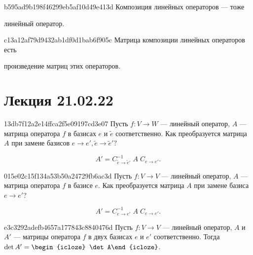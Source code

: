 \begin{note}{b595ad9b198f46299eb5af10d49e413d}
    Композиция линейных операторов --- тоже \begin{icloze}{1}линейный оператор.\end{icloze}
\end{note}

\begin{note}{c13a12af79d9432ab1df0d1bab6f905c}
    Матрица композиции линейных операторов есть \begin{icloze}{1}произведение матриц этих операторов.\end{icloze}
\end{note}

\section{Лекция 21.02.22}
\begin{note}{13db7f12a2e14ffca2f5e09197cd3e07}
    Пусть \( f : V \to W \) --- линейный оператор,  \( A \) --- матрица оператора \( f \) в базисах \( e \) и \( \tilde e \) соответственно. Как преобразуется матрица \( A \) при замене базисов \( e \to e', \tilde e \to \tilde e'? \)

    \begin{cloze}{1}
        \[
            A' = C^{-1}_{\tilde e \to \tilde e'} \; A \; C_{e \to e'}.
        \]
    \end{cloze}
\end{note}

\begin{note}{015e02c15f134a53b50a24729fb6ac3d}
    Пусть \( f : V \to V \) --- линейный оператор,  \( A \) --- матрица оператора \( f \) в базисе \( e \). Как преобразуется матрица \( A \) при замене базиса \( e \to e' \)?

    \begin{cloze}{1}
        \[
            A' = C^{-1}_{e \to e'} \; A \; C_{e \to e'}.
        \]
    \end{cloze}
\end{note}

\begin{note}{e3c3292adefb4657a177843c8840476d}
    Пусть \( f : V \to V \) --- линейный оператор, \( A \) и \( A' \) --- матрицы оператора \( f \) в двух базисах \( e \) и \( e' \) соответственно.
    Тогда \( \det A' = \begin{icloze}{1}\det A\end{icloze} \).
\end{note}

